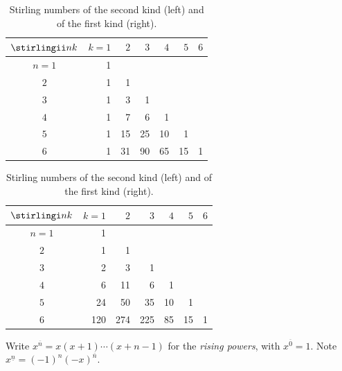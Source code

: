 \begin{table}[ht]
\centering
\begin{tabular}{c|rrrrrr}
$\stirlingii nk$ & $k=1$ & $2$ & $3$ & $4$ & $5$ & $6$\\
\hline
$n=1$ & 1 &&&&&\\
$2$ & 1 & 1 &&&&\\
$3$ & 1 & 3 & 1 &&&\\
$4$ & 1 & 7 & 6 & 1 &&\\
$5$ & 1 & 15 & 25 & 10 & 1 &\\
$6$ & 1 & 31 & 90 & 65 & 15 & 1\\
\end{tabular}

\medskip
\begin{tabular}{c|rrrrrr}
$\stirlingi nk$ & $k=1$ & $2$ & $3$ & $4$ & $5$ & $6$\\
\hline
$n=1$ & 1 &&&&&\\
$2$ & 1 & 1 &&&&\\
$3$ & 2 & 3 & 1 &&&\\
$4$ & 6 & 11 & 6 & 1 &&\\
$5$ & 24 & 50 & 35 & 10 & 1 &\\
$6$ & 120 & 274 & 225 & 85 & 15 & 1\\
\end{tabular}
\caption{Stirling numbers of the second kind (left) and of the first kind (right).}
\label{tab:stirling}
\end{table}

Write $x^{\overline n}=x(x+1)\cdots(x+n-1)$ for the \emph{rising powers}, with $x^{\overline0}=1$. Note
$x^{\underline n}=(-1)^n(-x)^{\overline n}$.

